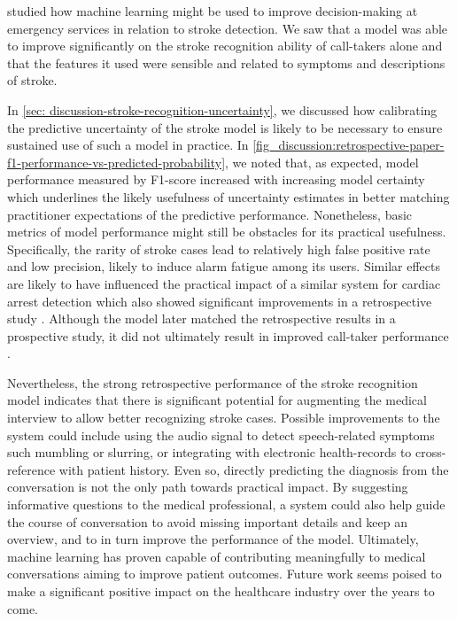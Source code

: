 




\vspace{1em}
\textbf{} studied how machine learning might be used to improve decision-making at emergency services in relation to stroke detection. 
We saw that a model was able to improve significantly on the stroke recognition ability of call-takers alone and that the features it used were sensible and related to symptoms and descriptions of stroke. 

In \cref{sec: discussion-stroke-recognition-uncertainty}, we discussed how calibrating the predictive uncertainty of the stroke model is likely to be necessary to ensure sustained use of such a model in practice. In \cref{fig_discussion:retrospective-paper-f1-performance-vs-predicted-probability}, we noted that, as expected, model performance measured by F1-score increased with increasing model certainty which underlines the likely usefulness of uncertainty estimates in better matching practitioner expectations of the predictive performance. 
Nonetheless, basic metrics of model performance might still be obstacles for its practical usefulness. Specifically, the rarity of stroke cases lead to relatively high false positive rate and low precision, likely to induce alarm fatigue among its users. Similar effects are likely to have influenced the practical impact of a similar system for cardiac arrest detection which also showed significant improvements in a retrospective study \parencite{cite14}. Although the model later matched the retrospective results in a prospective study, it did not ultimately result in improved call-taker performance \parencite{cite15}. 

Nevertheless, the strong retrospective performance of the stroke recognition model indicates that there is significant potential for augmenting the medical interview to allow better recognizing stroke cases. 
Possible improvements to the system could include using the audio signal to detect speech-related symptoms such mumbling or slurring, or integrating with electronic health-records to cross-reference with patient history. 
Even so, directly predicting the diagnosis from the conversation is not the only path towards practical impact. By suggesting informative questions to the medical professional, a system could also help guide the course of conversation to avoid missing important details and keep an overview, and to in turn improve the performance of the model. 
Ultimately, machine learning has proven capable of contributing meaningfully to medical conversations aiming to improve patient outcomes. Future work seems poised to make a significant positive impact on the healthcare industry over the years to come. 


